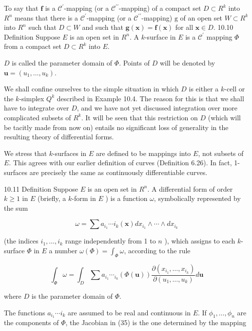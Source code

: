 \documentclass[10pt]{article}
\begin{document}
To say that $\mathbf{f}$ is a $\mathscr{C}^{\prime}$-mapping (or a $\mathscr{C}^{\prime \prime}$-mapping) of a compact set $D \subset R^{k}$ into $R^{n}$ means that there is a $\mathscr{C}^{\prime}$-mapping (or a $\mathscr{C}^{\prime \prime}$-mapping) $\mathrm{g}$ of an open set $W \subset R^{k}$ into $R^{n}$ such that $D \subset W$ and such that $\mathbf{g}(\mathbf{x})=\mathbf{f}(\mathbf{x})$ for all $\mathbf{x} \in D$. 10.10 Definition Suppose $E$ is an open set in $R^{n}$. A $k$-surface in $E$ is a $\mathscr{C}^{\prime}$ mapping $\Phi$ from a compact set $D \subset R^{k}$ into $E$.

$D$ is called the parameter domain of $\Phi$. Points of $D$ will be denoted by $\mathbf{u}=\left(u_{1}, \ldots, u_{k}\right)$.

We shall confine ourselves to the simple situation in which $D$ is either a $k$-cell or the $k$-simplex $Q^{k}$ described in Example 10.4. The reason for this is that we shall have to integrate over $D$, and we have not yet discussed integration over more complicated subsets of $R^{k}$. It will be seen that this restriction on $D$ (which will be tacitly made from now on) entails no significant loss of generality in the resulting theory of differential forms.

We stress that $k$-surfaces in $E$ are defined to be mappings into $E$, not subsets of $E$. This agrees with our earlier definition of curves (Definition 6.26). In fact, 1-surfaces are precisely the same as continuously differentiable curves.

10.11 Definition Suppose $E$ is an open set in $R^{n}$. A differential form of order $k \geq 1$ in $E$ (briefly, a $k$-form in $E$ ) is a function $\omega$, symbolically represented by the sum

$$
\omega=\sum a_{i_{1}} \cdots i_{k}(\mathbf{x}) d x_{i_{1}} \wedge \cdots \wedge d x_{i_{k}}
$$

(the indices $i_{1}, \ldots, i_{k}$ range independently from 1 to $n$ ), which assigns to each $k$-surface $\Phi$ in $E$ a number $\omega(\Phi)=\int_{\Phi} \omega$, according to the rule

$$
\int_{\Phi} \omega=\int_{D} \sum a_{i_{1}} \cdots_{i_{k}}(\Phi(\mathbf{u})) \frac{\partial\left(x_{i_{1}}, \ldots, x_{i_{k}}\right)}{\partial\left(u_{1}, \ldots, u_{k}\right)} d \mathbf{u}
$$

where $D$ is the parameter domain of $\Phi$.

The functions $a_{i_{1}} \cdots i_{k}$ are assumed to be real and continuous in $E$. If $\phi_{1}, \ldots, \phi_{n}$ are the components of $\Phi$, the Jacobian in (35) is the one determined by the mapping
\end{document}
